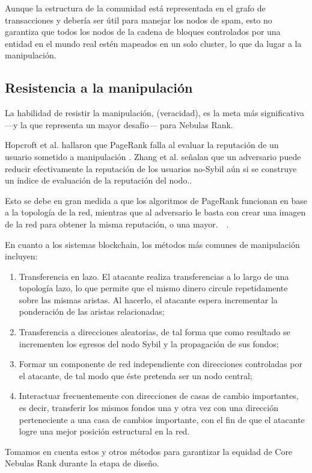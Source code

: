 Aunque la estructura de la comunidad está representada en el grafo de transacciones y debería ser útil para manejar los nodos de spam, esto no garantiza que todos los nodos de la cadena de bloques controlados por una entidad en el mundo real estén mapeados en un solo cluster, lo que da lugar a la manipulación.

\subsection{Resistencia a la manipulación}
La habilidad de resistir la manipulación, (veracidad), es la meta más significativa —y la que representa un mayor desafío— para Nebulas Rank.

Hopcroft et al. hallaron que PageRank falla al evaluar la reputación de un usuario sometido a manipulación \cite{hopcroft2007manipulation}. Zhang et al. señalan que un adversario puede reducir efectivamente la reputación de los usuarios no-Sybil aún si se construye un índice de evaluación de la reputación del nodo.\cite{zhang2016truetop}.

Esto se debe en gran medida a que los algoritmos de PageRank funcionan en base a la topología de la red, mientras que al adversario le basta con crear una imagen de la red para obtener la misma reputación, o una mayor.~\cite{cheng2005sybilproof}~\cite{cheng2006manipulability}.

En cuanto a los sistemas blockchain, los métodos más comunes de manipulación incluyen:
\begin{enumerate}
\item Transferencia en lazo. El atacante realiza transferencias a lo largo de una topología lazo, lo que permite que el mismo dinero circule repetidamente sobre las mismas aristas. Al hacerlo, el atacante espera incrementar la ponderación de las aristas relacionadas;
\item Transferencia a direcciones aleatorias, de tal forma que como resultado se incrementen los egresos del nodo Sybil y la propagación de sus fondos;
\item Formar un componente de red independiente con direcciones controladas por el atacante, de tal modo que éste pretenda ser un nodo central;
\item Interactuar frecuentemente con direcciones de casas de cambio importantes, es decir, transferir los mismos fondos una y otra vez con una dirección perteneciente a una casa de cambios importante, con el fin de que el atacante logre una mejor posición estructural en la red.
\end{enumerate}

Tomamos en cuenta estos y otros métodos para garantizar la equidad de Core Nebulas Rank durante la etapa de diseño.